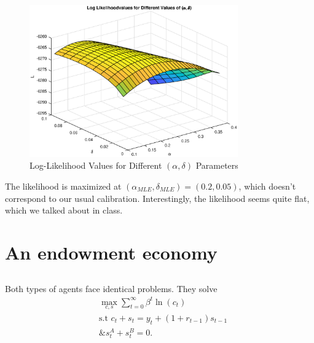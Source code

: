 \documentclass[12pt]{article}
\begin{document}
\begin{figure}[h]
    \centering
        \includegraphics[width=0.8\textwidth]{surface.eps}
        \caption{Log-Likelihood Values for Different $(\alpha,\delta)$ Parameters}
\end{figure}

The likelihood is maximized at $(\alpha_{MLE},\delta_{MLE}) = (0.2,0.05)$, which doesn't correspond to our usual calibration. Interestingly, the likelihood seems quite flat, which we talked about in class.


\newpage

\section{An endowment economy}

\subsection{}
Both types of agents face identical problems. They solve
\begin{align*}
&\max_{c, s} \sum_{t=0}^\infty \beta^t \ln(c_t)\\
&\text{s.t } c_t + s_t = y_t + (1+r_{t-1})s_{t-1}\\
&\text{\& } s^A_t + s^B_t = 0.
\end{align*}
\end{document}
